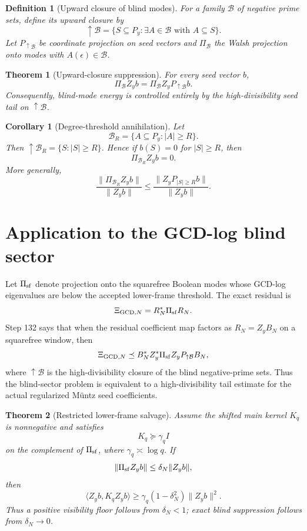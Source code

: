 \documentclass[11pt]{article}
\newtheorem{theorem}{Theorem}
\newtheorem{corollary}{Corollary}
\newtheorem{definition}{Definition}
\begin{document}
\begin{definition}[Upward closure of blind modes]
For a family $\mathcal B$ of negative prime sets, define its upward closure by
\[
  \uparrow\mathcal B=\{S\subseteq P_y:\exists A\in\mathcal B\text{ with }A\subseteq S\}.
\]
Let $P_{\uparrow\mathcal B}$ be coordinate projection on seed vectors and $\Pi_{\mathcal B}$ the Walsh projection onto modes with $A(\epsilon)\in\mathcal B$.
\end{definition}

\begin{theorem}[Upward-closure suppression]
For every seed vector $b$,
\[
\boxed{
  \Pi_{\mathcal B}Z_yb=\Pi_{\mathcal B}Z_yP_{\uparrow\mathcal B}b.
}
\]
Consequently, blind-mode energy is controlled entirely by the high-divisibility seed tail on $\uparrow\mathcal B$.
\end{theorem}

\begin{corollary}[Degree-threshold annihilation]
Let
\[
  \mathcal B_R=\{A\subseteq P_y:|A|\ge R\}.
\]
Then $\uparrow\mathcal B_R=\{S:|S|\ge R\}$. Hence if $b(S)=0$ for $|S|\ge R$, then
\[
\boxed{\Pi_{\mathcal B_R}Z_yb=0.}
\]
More generally,
\[
  \frac{\|\Pi_{\mathcal B_R}Z_yb\|}{\|Z_yb\|}
  \le
  \frac{\|Z_yP_{|S|\ge R}b\|}{\|Z_yb\|}.
\]
\end{corollary}

\section{Application to the GCD-log blind sector}
Let $\Pi_{\rm sf}$ denote projection onto the squarefree Boolean modes whose GCD-log eigenvalues are below the accepted lower-frame threshold. The exact residual is
\[
  \Xi_{{\rm GCD},N}=R_N^*\Pi_{\rm sf}R_N.
\]
Step 132 says that when the residual coefficient map factors as $R_N=Z_yB_N$ on a squarefree window, then
\[
  \Xi_{{\rm GCD},N}\preceq B_N^* Z_y^*\Pi_{\rm sf}Z_yP_{\uparrow\mathcal B} B_N,
\]
where $\uparrow\mathcal B$ is the high-divisibility closure of the blind negative-prime sets. Thus the blind-sector problem is equivalent to a high-divisibility tail estimate for the actual regularized M\"untz seed coefficients.

\begin{theorem}[Restricted lower-frame salvage]
Assume the shifted main kernel $K_q$ is nonnegative and satisfies
\[
  K_q\succeq \gamma_q I
\]
on the complement of $\Pi_{\rm sf}$, where $\gamma_q\asymp \log q$. If
\[
  \|\Pi_{\rm sf}Z_yb\|\le \delta_N\|Z_yb\|,
\]
then
\[
\boxed{
  \langle Z_yb,K_qZ_yb\rangle\ge \gamma_q(1-\delta_N^2)\|Z_yb\|^2.
}
\]
Thus a positive visibility floor follows from $\delta_N<1$; exact blind suppression follows from $\delta_N\to0$.
\end{theorem}
\end{document}
